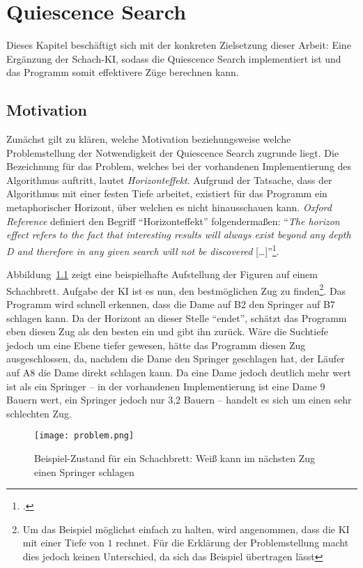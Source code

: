 
\chapter{Quiescence Search}\label{ch:quiescence}
Dieses Kapitel beschäftigt sich mit der konkreten Zielsetzung dieser Arbeit: Eine Ergänzung der Schach-KI, sodass die Quiescence Search implementiert ist und das Programm somit effektivere Züge berechnen kann. 

\section{Motivation}\label{section:motivation}
Zunächst gilt zu klären, welche Motivation beziehungsweise welche Problemstellung der Notwendigkeit der Quiescence Search zugrunde liegt. Die Bezeichnung für das Problem, welches bei der vorhandenen Implementierung des Algorithmus auftritt, lautet \textit{Horizonteffekt}. Aufgrund der Tatsache, dass der Algorithmus mit einer festen Tiefe arbeitet, existiert für das Programm ein metaphorischer Horizont, über welchen es nicht hinausschauen kann. \textit{Oxford Reference} definiert den Begriff "`Horizonteffekt"' folgendermaßen: "`\textit{The horizon effect refers to the fact that interesting results will always exist beyond any depth D and therefore in any given search will not be discovered} […]"'\footcite{oxford}.

Abbildung~\ref{fig:problem} zeigt eine beispielhafte Aufstellung der Figuren auf einem Schachbrett. Aufgabe der KI ist es nun, den bestmöglichen Zug zu finden\footnote{Um das Beispiel möglichst einfach zu halten, wird angenommen, dass die KI mit einer Tiefe von $1$ rechnet. Für die Erklärung der Problemstellung macht dies jedoch keinen Unterschied, da sich das Beispiel übertragen lässt}.  Das Programm wird schnell erkennen, dass die Dame auf B2 den Springer auf B7 schlagen kann. Da der Horizont an dieser Stelle "`endet"', schätzt das Programm eben diesen Zug als den besten ein und gibt ihn zurück. Wäre die Suchtiefe jedoch um eine Ebene tiefer gewesen, hätte das Programm diesen Zug ausgeschlossen, da, nachdem die Dame den Springer geschlagen hat, der Läufer auf A8 die Dame direkt schlagen kann. Da eine Dame jedoch deutlich mehr wert ist als ein Springer -- in der vorhandenen Implementierung ist eine Dame 9 Bauern wert, ein Springer jedoch nur 3,2 Bauern -- handelt es sich um einen sehr schlechten Zug.

\begin{figure}[H]
	\texttt{[image: problem.png]}
	\caption{Beispiel-Zustand für ein Schachbrett: Weiß kann im nächsten Zug einen Springer schlagen\footnotemark}
	\label{fig:problem}
\end{figure}

